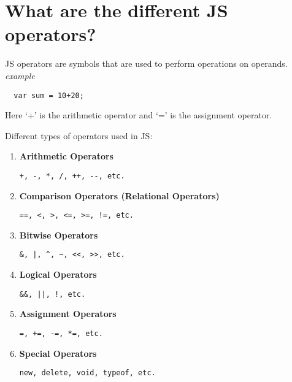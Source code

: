 \section{What are the different JS operators?}
JS operators are symbols that are used to perform operations on operands.
\textit{example}
\begin{verbatim}
  var sum = 10+20;
\end{verbatim}
Here `+' is the arithmetic operator and `=' is the assignment operator.

Different types of operators used in JS:
\begin{enumerate}
  \item \textbf{Arithmetic Operators}

    \verb|+, -, *, /, ++, --, etc.|

  \item \textbf{Comparison Operators (Relational Operators)}

    \verb|==, <, >, <=, >=, !=, etc.|

  \item \textbf{Bitwise Operators}

    \verb+&, |, ^, ~, <<, >>, etc.+

  \item \textbf{Logical Operators}

    \verb+&&, ||, !, etc.+

  \item \textbf{Assignment Operators}

    \verb|=, +=, -=, *=, etc.|

  \item \textbf{Special Operators}

    \verb|new, delete, void, typeof, etc.|
\end{enumerate}
